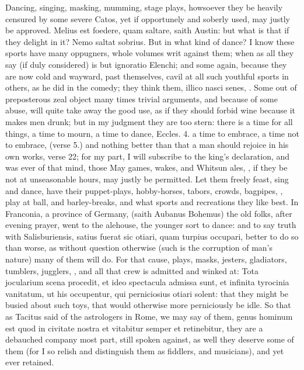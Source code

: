 {Dancing, singing, masking, mumming, stage plays, howsoever they be
heavily censured by some severe Catos, yet if opportunely and soberly
used, may justly be approved. Melius est foedere, quam saltare,
saith Austin: but what is that if they delight in it? Nemo
saltat sobrius. But in what kind of dance? I know these sports have
many oppugners, whole volumes writ against them; when as all they say
(if duly considered) is but ignoratio Elenchi; and some again, because
they are now cold and wayward, past themselves, cavil at all such
youthful sports in others, as he did in the comedy; they think them,
illico nasci senes, \etc{}. Some out of preposterous zeal object many times
trivial arguments, and because of some abuse, will quite take away the
good use, as if they should forbid wine because it makes men drunk; but
in my judgment they are too stern: there is a time for all things, a
time to mourn, a time to dance, Eccles.  4. a time to embrace, a
time not to embrace, (verse 5.) and nothing better than that a man
should rejoice in his own works, verse 22; for my part, I will
subscribe to the king's declaration, and was ever of that mind, those
May games, wakes, and Whitsun ales, \etc{}, if they be not at unseasonable
hours, may justly be permitted. Let them freely feast, sing and dance,
have their puppet-plays, hobby-horses, tabors, crowds, bagpipes, \etc{},
play at ball, and barley-breaks, and what sports and recreations they
like best. In Franconia, a province of Germany, (saith Aubanus
Bohemus) the old folks, after evening prayer, went to the alehouse, the
younger sort to dance: and to say truth with Salisburiensis,
satius fuerat sic otiari, quam turpius occupari, better to do so than
worse, as without question otherwise (such is the corruption of man's
nature) many of them will do. For that cause, plays, masks, jesters,
gladiators, tumblers, jugglers, \etc{}, and all that crew is admitted and
winked at: Tota jocularium scena procedit, et ideo spectacula
admissa sunt, et infinita tyrocinia vanitatum, ut his occupentur, qui
perniciosius otiari solent: that they might be busied about such toys,
that would otherwise more perniciously be idle. So that as
Tacitus said of the astrologers in Rome, we may say of them,
genus hominum est quod in civitate nostra et vitabitur semper et
retinebitur, they are a debauched company most part, still spoken
against, as well they deserve some of them (for I so relish and
distinguish them as fiddlers, and musicians), and yet ever retained.

}
